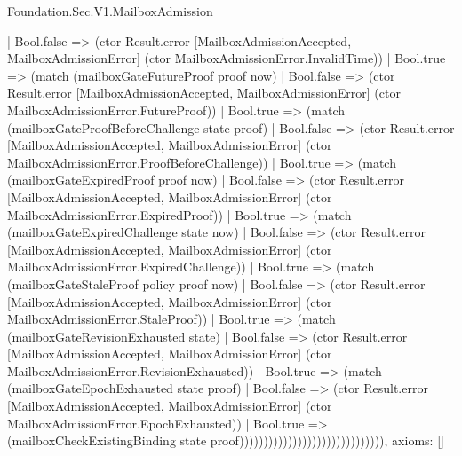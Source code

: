 \begin{lexlean}{Foundation.Sec.V1.MailboxAdmission}
\begin{semanticmodule}
{                                              | Bool.false => (ctor Result.error [MailboxAdmissionAccepted, MailboxAdmissionError] (ctor MailboxAdmissionError.InvalidTime))
                                              | Bool.true => (match (mailboxGateFutureProof proof now)
                                                | Bool.false => (ctor Result.error [MailboxAdmissionAccepted, MailboxAdmissionError] (ctor MailboxAdmissionError.FutureProof))
                                                | Bool.true => (match (mailboxGateProofBeforeChallenge state proof)
                                                  | Bool.false => (ctor Result.error [MailboxAdmissionAccepted, MailboxAdmissionError] (ctor MailboxAdmissionError.ProofBeforeChallenge))
                                                  | Bool.true => (match (mailboxGateExpiredProof proof now)
                                                    | Bool.false => (ctor Result.error [MailboxAdmissionAccepted, MailboxAdmissionError] (ctor MailboxAdmissionError.ExpiredProof))
                                                    | Bool.true => (match (mailboxGateExpiredChallenge state now)
                                                      | Bool.false => (ctor Result.error [MailboxAdmissionAccepted, MailboxAdmissionError] (ctor MailboxAdmissionError.ExpiredChallenge))
                                                      | Bool.true => (match (mailboxGateStaleProof policy proof now)
                                                        | Bool.false => (ctor Result.error [MailboxAdmissionAccepted, MailboxAdmissionError] (ctor MailboxAdmissionError.StaleProof))
                                                        | Bool.true => (match (mailboxGateRevisionExhausted state)
                                                          | Bool.false => (ctor Result.error [MailboxAdmissionAccepted, MailboxAdmissionError] (ctor MailboxAdmissionError.RevisionExhausted))
                                                          | Bool.true => (match (mailboxGateEpochExhausted state proof)
                                                            | Bool.false => (ctor Result.error [MailboxAdmissionAccepted, MailboxAdmissionError] (ctor MailboxAdmissionError.EpochExhausted))
                                                            | Bool.true => (mailboxCheckExistingBinding state proof)))))))))))))))))))))))))))))),
  axioms: []
}
\end{semanticmodule}
\end{lexlean}
